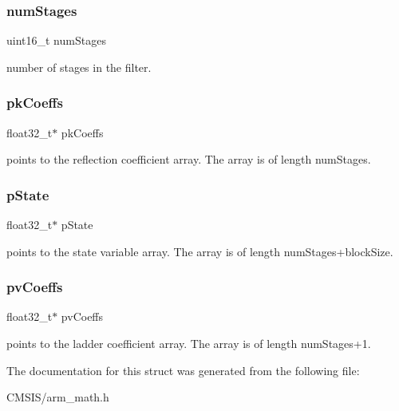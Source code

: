 \subsubsection{\texorpdfstring{numStages}{numStages}}
{\footnotesize\ttfamily uint16\+\_\+t num\+Stages}

number of stages in the filter. \mbox{\label{structarm__iir__lattice__instance__f32_a994889c5c4a866c50a0ee63326378816}} 
\subsubsection{\texorpdfstring{pkCoeffs}{pkCoeffs}}
{\footnotesize\ttfamily float32\+\_\+t$\ast$ pk\+Coeffs}

points to the reflection coefficient array. The array is of length num\+Stages. \mbox{\label{structarm__iir__lattice__instance__f32_a335c87e6fdc4b96601d95a5de8b9c463}} 
\subsubsection{\texorpdfstring{pState}{pState}}
{\footnotesize\ttfamily float32\+\_\+t$\ast$ p\+State}

points to the state variable array. The array is of length num\+Stages+block\+Size. \mbox{\label{structarm__iir__lattice__instance__f32_a0f8815744fade9c580d44277ff802308}} 
\subsubsection{\texorpdfstring{pvCoeffs}{pvCoeffs}}
{\footnotesize\ttfamily float32\+\_\+t$\ast$ pv\+Coeffs}

points to the ladder coefficient array. The array is of length num\+Stages+1. 

The documentation for this struct was generated from the following file\+:\begin{DoxyCompactItemize}
\item 
C\+M\+S\+I\+S/arm\+\_\+math.\+h\end{DoxyCompactItemize}
